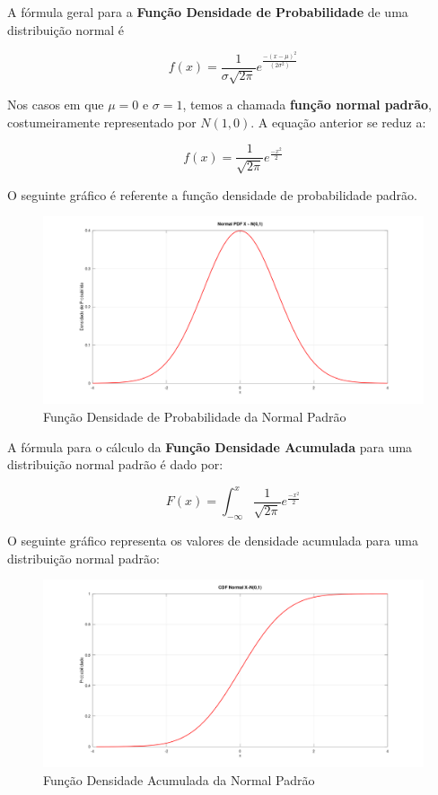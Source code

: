 \documentclass[
]{book}
\begin{document}
A fórmula geral para a \textbf{Função Densidade de Probabilidade} de uma distribuição normal é

\begin{equation}
  f(x) =  \frac{1}{\sigma \sqrt{2 \pi}} e^{\frac{-(x-\mu)^2}{(2\sigma^2)}}
\end{equation}

Nos casos em que \(\mu = 0\) e \(\sigma = 1\), temos a chamada \textbf{função normal padrão}, costumeiramente representado por \(N(1,0)\). A equação anterior se reduz a:

\begin{equation}
  f(x) = \frac{1}{\sqrt{2 \pi}} e^{\frac{-x^2}{2}}
\end{equation}

O seguinte gráfico é referente a função densidade de probabilidade padrão.

\begin{figure}

{\centering \includegraphics[width=0.8\linewidth]{images/normalpdf} 

}

\caption{Função Densidade de Probabilidade da Normal Padrão}\label{fig:unnamed-chunk-1}
\end{figure}

A fórmula para o cálculo da \textbf{Função Densidade Acumulada} para uma distribuição normal padrão é dado por:

\begin{equation}
  F(x) = \int_{-\infty}^x \frac{1}{\sqrt{2 \pi}} e^{\frac{-x^2}{2}}
\end{equation}

O seguinte gráfico representa os valores de densidade acumulada para uma distribuição normal padrão:

\begin{figure}

{\centering \includegraphics[width=0.8\linewidth]{images/normalcdf} 

}

\caption{Função Densidade Acumulada da Normal Padrão}\label{fig:unnamed-chunk-2}
\end{figure}
\end{document}
